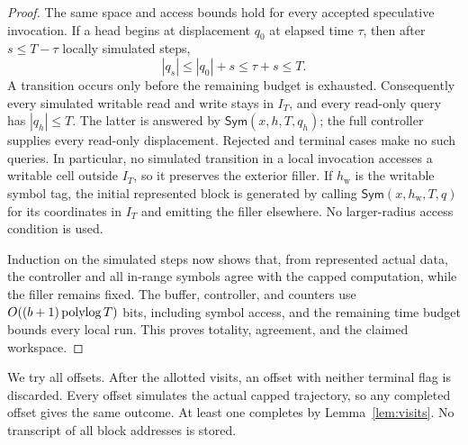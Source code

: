 \begin{proof}
The same space and access bounds hold for every accepted speculative
invocation. If a head begins at displacement \(q_0\) at elapsed time
\(\tau\), then after \(s\le T-\tau\) locally simulated steps,
\begin{equation}\label{eq:local-confinement}
 |q_s|\le |q_0|+s\le\tau+s\le T.
\end{equation}
A transition occurs only before the remaining budget is exhausted.
Consequently every simulated writable read and write stays in \(I_T\),
and every read-only query has \(|q_h|\le T\). The latter is answered by
\(\mathsf{Sym}(x,h,T,q_h)\); the full controller supplies every
read-only displacement. Rejected and terminal cases make no such
queries. In particular, no simulated transition in a local invocation
accesses a writable cell outside \(I_T\), so it preserves the exterior
filler. If \(h_{\mathrm{w}}\) is the writable symbol tag, the initial
represented block is generated by calling
\(\mathsf{Sym}(x,h_{\mathrm{w}},T,q)\) for its coordinates in \(I_T\)
and emitting the filler elsewhere. No larger-radius access condition
is used.

Induction on the simulated steps now shows that, from represented
actual data, the controller and all in-range symbols agree with the
capped computation, while the filler remains fixed. The buffer,
controller, and counters use \(O((b+1)\operatorname{polylog} T)\) bits, including
symbol access, and the remaining time budget bounds every local run.
This proves totality, agreement, and the claimed workspace.
\end{proof}

We try all offsets. After the allotted visits, an offset with neither
terminal flag is discarded. Every offset simulates the actual capped
trajectory, so any completed offset gives the same outcome.
At least one completes by Lemma~\ref{lem:visits}.
No transcript of all block addresses is stored.

